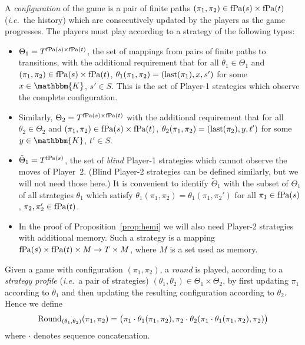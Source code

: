\documentclass[copyright,creativecommons,sharealike]{eptcs}
\theoremstyle{plain}
\newcommand*\Strat{\Theta}
\newcommand*\Stratblind{\tilde \Strat}
\renewcommand*\K{\mathbbm{K}}
\newcommand*\ie{\textit{i.e.}}
\newcommand*\last{\textup{last}} \newcommand{\Round}[1]{\ensuremath{\textup{Round}_{(#1)}}\xspace}
\begin{document}
A \emph{configuration} of the game is a pair of finite paths $( \pi_1,
\pi_2)\in \operatorname{fPa}( s)\times \operatorname{fPa}( t)$ (\ie~the history) which are
consecutively updated by the players as the game progresses.
The players must play according to a strategy of the following types: 
\begin{itemize}
\item $\Strat_1= T^{ \fPa( s)\times \fPa( t)}$, the set of
  mappings from pairs of finite paths to transitions, with the
  additional requirement that for all $\theta_1\in \Strat_1$ and $(
  \pi_1, \pi_2)\in \operatorname{fPa}( s)\times \operatorname{fPa}( t)$, $\theta_1( \pi_1,
  \pi_2)=( \last( \pi_1), x, s')$ for some $x\in \K$, $s'\in S$.  This
  is the set of Player-1 strategies which observe the complete
  configuration.
\item Similarly, $\Strat_2= T^{ \fPa( s)\times \fPa( t)}$ with the
  additional requirement that for all $\theta_2\in \Strat_2$ and $(
  \pi_1, \pi_2)\in \operatorname{fPa}( s)\times \operatorname{fPa}( t)$, $\theta_2( \pi_1,
  \pi_2)=( \last( \pi_2), y, t')$ for some $y\in \K$, $t'\in S$.
\item $\Stratblind_1= T^{ \fPa( s)}$, the set of \emph{blind}
  Player-1 strategies which cannot observe the moves of Player~2.
  (Blind Player-2 strategies can be defined similarly, but we will not
  need those here.)  It is convenient to identify $\Stratblind_1$ with
  the subset of $\Strat_1$ of all strategies $\theta_1$ which satisfy
  $\theta_1( \pi_1, \pi_2)= \theta_1( \pi_1, \pi_2')$ for all
  $\pi_1\in \operatorname{fPa}( s)$, $\pi_2, \pi_2'\in \operatorname{fPa}( t)$.
\item In the proof of Proposition~\ref{prop:hemi} we will also need
  Player-2 strategies with additional memory.  Such a strategy is a
  mapping $\operatorname{fPa}( s)\times \operatorname{fPa}(t)\times M\to T\times M$, where $M$
  is a set used as memory.
\end{itemize}

Given a game with configuration $( \pi_1, \pi_2)$, a \emph{round} is
played, according to a \emph{strategy profile} (\ie~a pair of
strategies) $( \theta_1, \theta_2)\in \Strat_1\times \Strat_2$, by
first updating $\pi_1$ according to $\theta_1$ and then updating the
resulting configuration according to $\theta_2$.  Hence we define
\begin{equation*}
  \Round{ \theta_1, \theta_2}( \pi_1, \pi_2)=\big( \pi_1\cdot \theta_1(
  \pi_1, \pi_2), \pi_2\cdot \theta_2( \pi_1\cdot \theta_1( \pi_1, \pi_2),
  \pi_2)\big)
\end{equation*}
where $\cdot$ denotes sequence concatenation.
\end{document}
